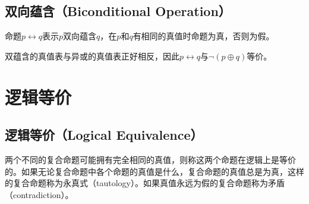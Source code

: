 \documentclass[12pt, openany, oneside]{book}
\begin{document}
\subsection{双向蕴含（Biconditional Operation）}

命题$ p \leftrightarrow q $表示$ p $双向蕴含$ q $，在$ p $和$ q $有相同的真值时命题为真，否则为假。

\begin{table}[H]
	\centering
	\caption{双向蕴含真值表}
\end{table}

双蕴含的真值表与异或的真值表正好相反，因此$ p \leftrightarrow q $与$ \neg (p \oplus q) $等价。

\newpage

\section{逻辑等价}

\subsection{逻辑等价（Logical Equivalence）}

两个不同的复合命题可能拥有完全相同的真值，则称这两个命题在逻辑上是等价的。如果无论复合命题中各个命题的真值是什么，复合命题的真值总是为真，这样的复合命题称为永真式（tautology）。如果真值永远为假的复合命题称为矛盾（contradiction）。

\begin{table}[H]
	\centering
	\caption{逻辑等价}
\end{table}
\end{document}
